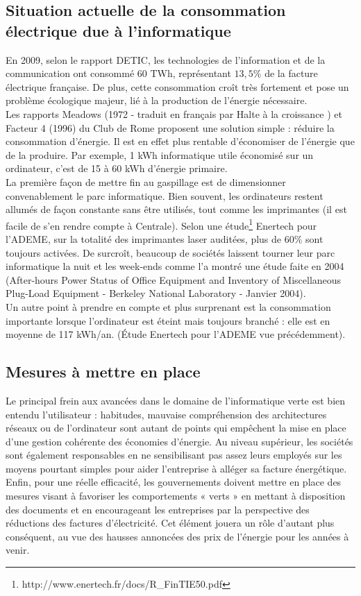 \documentclass[a4paper,11pt,french]{report}
\begin{document}
\subsection{Situation actuelle de la consommation électrique due à l'informatique}
En 2009, selon le rapport DETIC\cite{Detic}, les technologies de l’information et de la communication ont consommé 60 TWh, représentant $13,5\%$ de la facture électrique française. De plus, cette consommation croît très fortement et pose un problème écologique majeur, lié à la production de l’énergie nécessaire.\\

Les rapports Meadows (1972 - traduit en français par \og Halte à la croissance \fg \cite{Wiki2}) et Facteur 4 (1996) du Club de Rome proposent une solution simple : réduire la consommation d’énergie. Il est en effet plus rentable d’économiser de l’énergie que de la produire. Par exemple, 1 kWh informatique utile économisé sur un ordinateur, c’est de 15 à 60 kWh d’énergie primaire.\\

La première façon de mettre fin au gaspillage est de dimensionner convenablement le parc informatique. Bien souvent, les ordinateurs restent allumés de façon constante sans être utilisés, tout comme les imprimantes (il est facile de s’en rendre compte à Centrale). Selon une étude\footnote{\textsf{http://www.enertech.fr/docs/R\_{}FinTIE50.pdf}} Enertech pour l’ADEME, sur la totalité des imprimantes laser auditées, plus de $60\%$ sont toujours activées. De surcroît, beaucoup de sociétés laissent tourner leur parc informatique la nuit et les week-ends comme l’a montré une étude faite en 2004 (After-hours Power Status of Office Equipment and Inventory of Miscellaneous Plug-Load Equipment - Berkeley National Laboratory - Janvier 2004).\\

Un autre point à prendre en compte et plus surprenant est la consommation importante lorsque l’ordinateur est éteint mais toujours branché : elle est en moyenne de 117 kWh/an. (Étude Enertech pour l’ADEME vue précédemment).

\subsection{Mesures à mettre en place}
Le principal frein aux avancées dans le domaine de l’informatique verte est bien entendu l’utilisateur : habitudes, mauvaise compréhension des architectures réseaux ou de l’ordinateur sont autant de points qui empêchent la mise en place d’une gestion cohérente des économies d’énergie. Au niveau supérieur, les sociétés sont également responsables en ne sensibilisant pas assez leurs employés sur les moyens pourtant simples pour aider l’entreprise à alléger sa facture énergétique. Enfin, pour une réelle efficacité, les gouvernements doivent mettre en place des mesures visant à favoriser les comportements « verts » en mettant à disposition des documents et en encourageant les entreprises par la perspective des réductions des factures d’électricité. Cet élément jouera un rôle d’autant plus conséquent, au vue des hausses annoncées des prix de l’énergie pour les années à venir.\\
\end{document}
